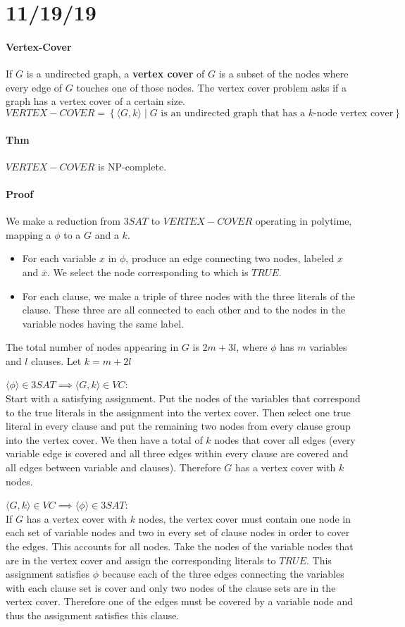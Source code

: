 \documentclass[12 pt]{article}
\begin{document}
\section{11/19/19}
\paragraph{Vertex-Cover} If $G$ is a undirected graph, a
\textbf{vertex cover} of $G$ is a subset of the nodes where every edge
of $G$ touches one of those nodes. The vertex cover problem asks if a
graph has a vertex cover of a certain size.
$$VERTEX-COVER = \left\{\langle G,k \rangle \mid G \text{ is an
    undirected graph that has a $k$-node vertex cover}\right\}$$
\paragraph{Thm} $VERTEX-COVER$ is NP-complete.
\paragraph{Proof} We make a reduction from $3SAT$ to $VERTEX-COVER$
operating in polytime, mapping a $\phi$ to a $G$ and a $k$.
\begin{itemize}
\item For each variable $x$ in $\phi$, produce an edge connecting two nodes, labeled
$x$ and $\overline{x}$. We select the node corresponding to which is
$TRUE$.
\item For each clause, we make a triple of three nodes with the three
  literals of the clause. These three are all connected to each other
  and to the nodes in the variable nodes having the same label.
\end{itemize}
The total number of nodes appearing in $G$ is $2m + 3 l$, where
$\phi$ has $m$ variables and $l$ clauses. Let $k = m + 2 l$

$\langle \phi \rangle \in 3SAT \implies \langle G,k \rangle \in VC$:
\\ Start with a satisfying assignment. Put the nodes of the variables
that correspond to the true literals in the assignment into the vertex
cover. Then select one true literal in every clause and put the
remaining two nodes from every clause group into the vertex cover. We
then have a total of $k$ nodes that cover all edges (every variable
edge is covered and all three edges within every clause are covered
and all edges between variable and clauses). Therefore $G$ has a
vertex cover with $k$ nodes.

$\langle G,k \rangle \in VC \implies \langle \phi \rangle \in 3SAT$:
\\ If $G$ has a vertex cover with $k$ nodes, the vertex cover must
contain one node in each set of variable nodes and two in every set of
clause nodes in order to cover the edges. This accounts for all
nodes. Take the nodes of the variable nodes that are in the vertex
cover and assign the corresponding literals to $TRUE$. This assignment
satisfies $\phi$ because each of the three edges connecting the
variables with each clause set is cover and only two nodes of the
clause sets are in the vertex cover. Therefore one of the edges must
be covered by a variable node and thus the assignment satisfies this
clause.
\end{document}
